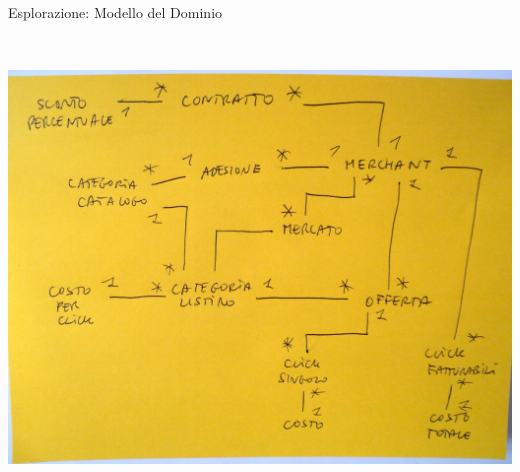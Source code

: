 \documentclass[compress, red, 14pt, pdf]{beamer}
\begin{document}
\begin{frame}{Esplorazione: Modello del Dominio}
\begin{columns}[T]
\begin{column}{.5\textwidth}
				\\ \vspace*{0.3cm}
				\hspace*{-0.3cm} \includegraphics[scale=0.13]{images/domain-3}
		    \end{column}
		 \end{columns}
	\end{frame}
\end{document}
